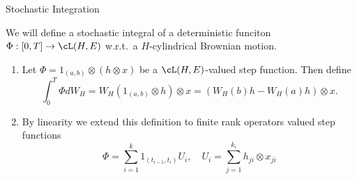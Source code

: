 %    
%


\begin{frame}
    {Stochastic Integration}
    
    We will define a stochastic integral of a deterministic 
    funciton $\Phi: [0,T] \to \cL(H,E)$ w.r.t.\ a $H$-cylindrical Brownian
    motion.

    \begin{enumerate}
        \item Let $\Phi = 1_{(a,b)} \otimes ( h \otimes x)$ be a $\cL(H,E)$-valued
            step function. Then define
            \begin{equation*}
                \int_{0}^{T}\Phi d W_H 
                = W_H( 1_{(a,b)} \otimes h) \otimes x
                = \left( W_H(b)h - W_H(a)h \right) \otimes x.
            \end{equation*}
        \item By linearity we extend this definition to finite rank operators 
            valued step functions
            \begin{equation*}
                \Phi = \sum_{i=1}^{k} 1_{(t_{i-1}, t_{i})} U_i, \quad 
                U_i = \sum_{j=1}^{k_i} h_{ji} \otimes x_{ji}
            \end{equation*}
    \end{enumerate}
\end{frame}


